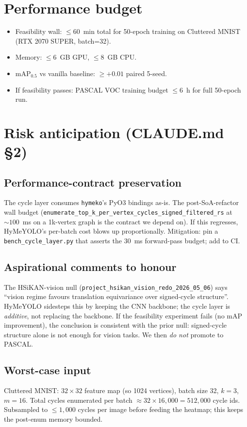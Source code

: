 \documentclass[11pt,a4paper]{article}
\begin{document}
\section{Performance budget}
\begin{itemize}
\item Feasibility wall: $\le 60$~min total for 50-epoch training on
  Cluttered MNIST (RTX 2070 SUPER, batch=32).
\item Memory: $\le 6$~GB GPU, $\le 8$~GB CPU.
\item mAP$_{0.5}$ vs vanilla baseline: $\ge +0.01$ paired 5-seed.
\item If feasibility passes: PASCAL VOC training budget $\le 6$~h
  for full 50-epoch run.
\end{itemize}

\section{Risk anticipation (CLAUDE.md \S2)}

\subsection*{Performance-contract preservation}
The cycle layer consumes \texttt{hymeko}'s PyO3 bindings as-is.
The post-SoA-refactor wall budget (\texttt{enumerate\_top\_k\_per\_vertex\_cycles\_signed\_filtered\_rs}
at $\sim 100$~ms on a 1k-vertex graph is the contract we depend on).
If this regresses, HyMeYOLO's per-batch cost blows up
proportionally.  Mitigation: pin a \texttt{bench\_cycle\_layer.py}
that asserts the 30~ms forward-pass budget; add to CI.

\subsection*{Aspirational comments to honour}
The HSiKAN-vision null
(\texttt{project\_hsikan\_vision\_redo\_2026\_05\_06}) says ``vision
regime favours translation equivariance over signed-cycle
structure''.  HyMeYOLO sidesteps this by keeping the CNN backbone;
the cycle layer is \emph{additive}, not replacing the backbone.  If
the feasibility experiment fails (no mAP improvement), the conclusion
is consistent with the prior null: signed-cycle structure alone is
not enough for vision tasks.  We then \emph{do not} promote to
PASCAL.

\subsection*{Worst-case input}
Cluttered MNIST: $32 \times 32$ feature map (so 1024 vertices),
batch size 32, $k=3$, $m=16$.  Total cycles enumerated per batch
$\approx 32 \times 16{,}000 = 512{,}000$ cycle ids.  Subsampled to
$\le 1{,}000$ cycles per image before feeding the heatmap; this
keeps the post-enum memory bounded.
\end{document}
